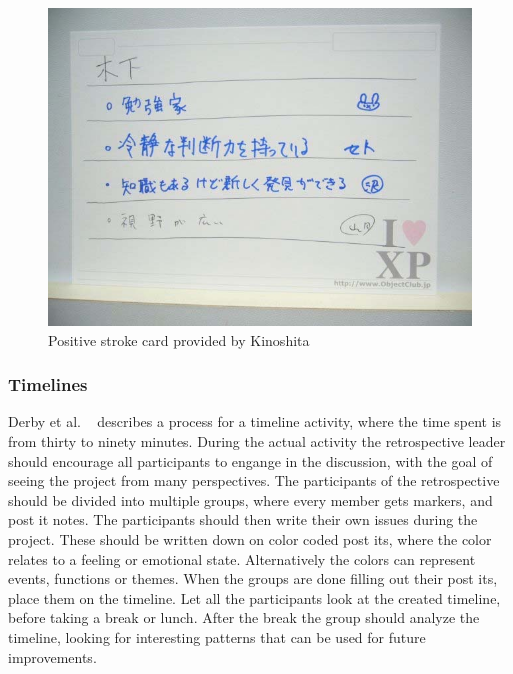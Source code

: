 \documentclass[12pt]{article}
\begin{document}
\begin{figure}[h!]
	\centering
	\includegraphics[width=\textwidth]{figures/positive-strokes.png}
	\caption{Positive stroke card provided by Kinoshita ~\cite{Kinoshita2008}}
	\label{figure:positive-strokes}
\end{figure}

\subsubsection{Timelines}
Derby et al. ~\cite{Derby2007} describes a process for a timeline activity, where the time spent is from thirty to ninety minutes. During the actual activity the retrospective leader should encourage all participants to engange in the discussion, with the goal of seeing the project from many perspectives. The participants of the retrospective should be divided into multiple groups, where every member gets markers, and post it notes. The participants should then write their own issues during the project. These should be written down on color coded post its, where the color relates to a feeling or emotional state. Alternatively  the colors can represent events, functions or themes. When the groups are done filling out their post its, place them on the timeline. Let all the participants look at the created timeline, before taking a break or lunch. After the break the group should analyze the timeline, looking for interesting patterns that can be used for future improvements.
\end{document}
